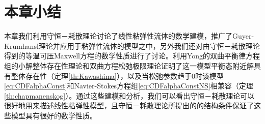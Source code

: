 	\section{本章小结}
	本章我们利用守恒－耗散理论讨论了线性粘弹性流体的数学建模，推广了Guyer-Krumhansl理论并应用于粘弹性流体的模型之中，另外我们还对由守恒－耗散理论得到的等温可压Maxwell方程的数学性质进行了讨论。利用Yong的双曲平衡律方程组的小解整体存在性理论和双曲方程松弛极限理论证明了这一模型平衡态附近解具有整体存在性（定理\ref{th:Kawashima}），以及当松弛参数趋于$0$时该模型\eqref{eq:CDFalphaConst}和Navier-Stokes方程组\eqref{eq:CDFalphaConstNS}相兼容（定理\ref{th:chapmanenskog}）。通过这些建模和分析，我们可以看出守恒－耗散理论可以很好地用来描述线性粘弹性模型，且守恒－耗散理论所提出的的结构条件保证了这些模型具有很好的数学性质。


